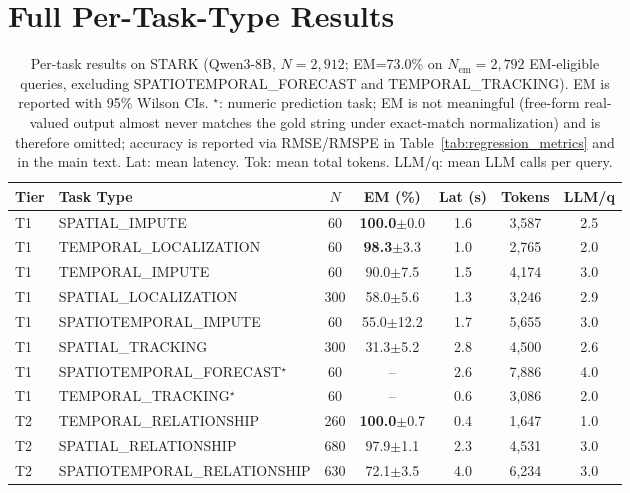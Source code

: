 \section{Full Per-Task-Type Results}
\label{app:full_results}

\begin{table}[!htbp]
\centering
\caption{Per-task results on STARK (Qwen3-8B, $N=2{,}912$; EM=73.0\% on $N_\text{em}=2{,}792$ EM-eligible queries, excluding SPATIOTEMPORAL\_FORECAST and TEMPORAL\_TRACKING).  EM is reported with 95\% Wilson CIs.  $^\star$: numeric prediction task; EM is not meaningful (free-form real-valued output almost never matches the gold string under exact-match normalization) and is therefore omitted; accuracy is reported via RMSE/RMSPE in Table~\ref{tab:regression_metrics} and in the main text.  Lat: mean latency.  Tok: mean total tokens.  LLM/q: mean LLM calls per query.}
\label{tab:stark_full}
\scriptsize
\begin{tabular}{llccccc}
\toprule
Tier & Task Type & $N$ & EM (\%) & Lat (s) & Tokens & LLM/q \\
\midrule
T1 & SPATIAL\_IMPUTE              & 60  & \textbf{100.0}\tiny{$\pm$0.0} & 1.6 & 3{,}587 & 2.5 \\
T1 & TEMPORAL\_LOCALIZATION       & 60  & \textbf{98.3}\tiny{$\pm$3.3}  & 1.0 & 2{,}765 & 2.0 \\
T1 & TEMPORAL\_IMPUTE             & 60  & 90.0\tiny{$\pm$7.5}           & 1.5 & 4{,}174 & 3.0 \\
T1 & SPATIAL\_LOCALIZATION        & 300 & 58.0\tiny{$\pm$5.6}           & 1.3 & 3{,}246 & 2.9 \\
T1 & SPATIOTEMPORAL\_IMPUTE       & 60  & 55.0\tiny{$\pm$12.2}          & 1.7 & 5{,}655 & 3.0 \\
T1 & SPATIAL\_TRACKING            & 300 & 31.3\tiny{$\pm$5.2}           & 2.8 & 4{,}500 & 2.6 \\
T1 & SPATIOTEMPORAL\_FORECAST$^\star$  & 60  & --                       & 2.6 & 7{,}886 & 4.0 \\
T1 & TEMPORAL\_TRACKING$^\star$       & 60  & --                       & 0.6 & 3{,}086 & 2.0 \\
\midrule
T2 & TEMPORAL\_RELATIONSHIP       & 260 & \textbf{100.0}\tiny{$\pm$0.7} & 0.4 & 1{,}647 & 1.0 \\
T2 & SPATIAL\_RELATIONSHIP        & 680 & 97.9\tiny{$\pm$1.1}           & 2.3 & 4{,}531 & 3.0 \\
T2 & SPATIOTEMPORAL\_RELATIONSHIP & 630 & 72.1\tiny{$\pm$3.5}           & 4.0 & 6{,}234 & 3.0 \\

\end{tabular}
\end{table}

